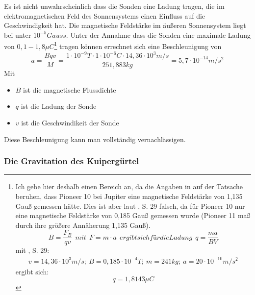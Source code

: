 Es ist nicht unwahrscheinlich dass die Sonden eine Ladung tragen, die im
elektromagnetischen Feld des Sonnensystems einen Einfluss auf die
Geschwindigkeit hat. Die magnetische Feldst\"arke im \"au{\ss}eren
Sonnensystem liegt bei unter $10^{-5}\mathit{Gauss}$\cite{Anderson2002}.
Unter der Annahme dass die Sonden eine maximale Ladung von $0,1-1,8\mu
C$\footnote{ %
Ich gebe hier deshalb einen Bereich an, da die Angaben in \cite{Null1976} auf der Tatsache beruhen, dass
Pioneer 10 bei Jupiter eine magnetische Feldst\"arke von 1,135 Gau{\ss}
gemessen h\"atte. Dies ist aber laut \cite{Anderson2002}, S. 29 falsch, da f\"ur Pioneer 10 nur eine
magnetische Feldst\"arke von 0,185 Gau{\ss} gemessen wurde (Pioneer 11
ma{\ss} durch ihre gr\"o{\ss}ere Ann\"aherung 1,135 Gau{\ss}).
\begin{equation*}
B=\frac{F_{B}}{\mathit{qv}}\ \ \mathit{mit}\ \ F=m\cdot
a\ \ \mathit{ergibt}\mathit{sich}\mathit{f\text{\"u}r}\mathit{die}\mathit{Ladung}\ \ q=\frac{\mathit{ma}}{\mathit{BV}}
\end{equation*}
mit \cite{Anderson2002}, S. 29:
\begin{equation*}
\begin{gathered}v=14,36\cdot 10^{3}m/s;\ B=0,185\cdot
10^{-4}T;\ m=241\mathit{kg};\ a=20\cdot 10^{-10}m/s^{2}\end{gathered}
\end{equation*}
ergibt sich:
\begin{equation*}
q=1,8143\mu C
\end{equation*}}
tragen k\"onnen errechnet sich eine Beschleunigung von
\begin{equation}
a=\frac{\mathit{Bqv}}{M}=\frac{1\cdot 10^{-9}T\cdot 1\cdot
10^{-6}C\cdot 14,36\cdot 10^{3}m/s}{251,883\mathit{kg}}=5,7\cdot
10^{-14}m/s^{2}
\end{equation}
Mit 
\begin{itemize}
\item $B$ ist die magnetische Flussdichte
\item $q$ ist die Ladung der Sonde
\item $v$ ist die Geschwindikeit der Sonde
\end{itemize}

Diese Beschleunigung kann man vollst\"andig vernachl\"assigen.


\bigskip

\subsubsection{Die Gravitation des Kuiperg\"urtel}

